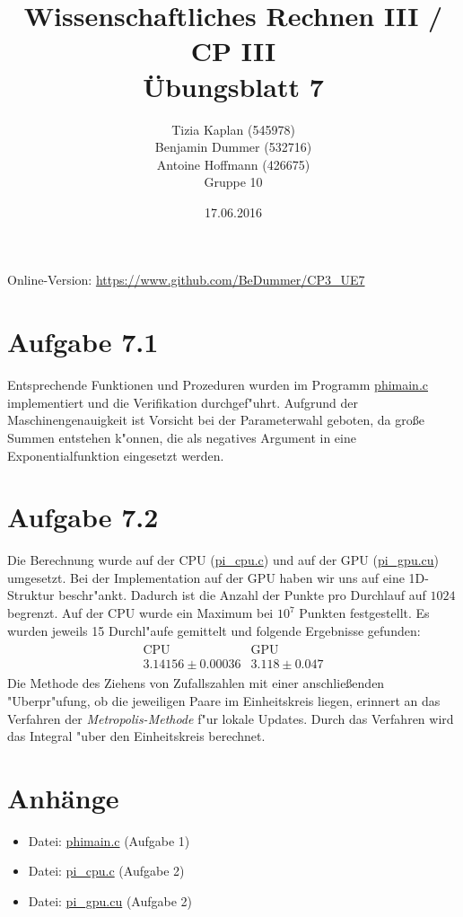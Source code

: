 \documentclass[%
	paper=A4,	%
	pagesize,	%
	DIV=calc,	%
	smallheadings,	%
	ngerman		%
]{scrartcl}
\title{{\bf Wissenschaftliches Rechnen III / CP III}\\Übungsblatt 7}
\author{Tizia Kaplan (545978)\\Benjamin Dummer (532716)\\Antoine Hoffmann (426675)\\Gruppe 10}
\date{17.06.2016}
\begin{document}
\maketitle
Online-Version: \href{https://www.github.com/BeDummer/CP3_UE7}{\url{https://www.github.com/BeDummer/CP3_UE7}}

\section*{Aufgabe 7.1}
Entsprechende Funktionen und Prozeduren wurden im Programm \url{phimain.c} implementiert und die Verifikation durchgef"uhrt. Aufgrund der Maschinengenauigkeit ist Vorsicht bei der Parameterwahl geboten, da gro\ss e Summen entstehen k"onnen, die als negatives Argument in eine Exponentialfunktion eingesetzt werden.

\section*{Aufgabe 7.2}
Die Berechnung wurde auf der CPU (\url{pi_cpu.c}) und auf der GPU (\url{pi_gpu.cu}) umgesetzt.
Bei der Implementation auf der GPU haben wir uns auf eine 1D-Struktur beschr"ankt. Dadurch ist die Anzahl der Punkte pro Durchlauf auf $1024$ begrenzt. Auf der CPU wurde ein Maximum bei $10^7$ Punkten festgestellt. Es wurden jeweils 15 Durchl"aufe gemittelt und folgende Ergebnisse gefunden:
\begin{eqnarray} \nonumber
	\begin{array}{c|c}
 \mbox{CPU} & \mbox{GPU}\\ \hline
3.14156 \pm 0.00036 & 3.118 \pm 0.047  
	\end{array}
\end{eqnarray}
Die Methode des Ziehens von Zufallszahlen mit einer anschlie\ss enden "Uberpr"ufung, ob die jeweiligen Paare im Einheitskreis liegen, erinnert an das Verfahren der \emph{Metropolis-Methode} f"ur lokale Updates. Durch das Verfahren wird das Integral "uber den Einheitskreis berechnet.

\section*{Anhänge}
\begin{itemize}
	\item Datei: \url{phimain.c} (Aufgabe 1)
	\item Datei: \url{pi_cpu.c} (Aufgabe 2)
	\item Datei: \url{pi_gpu.cu} (Aufgabe 2)
\end{itemize}
\end{document}
